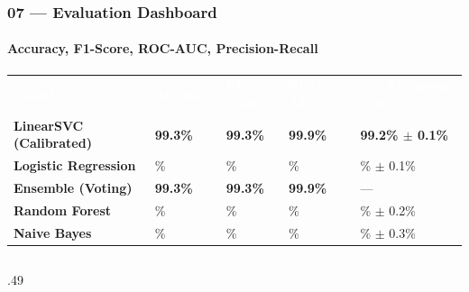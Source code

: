 \documentclass[aspectratio=169,10pt]{beamer}
\begin{document}
\begin{frame}[t]
\frametitle{07 --- Evaluation Dashboard}
\framesubtitle{Accuracy, F1-Score, ROC-AUC, Precision-Recall}
\vspace{.04cm}
\renewcommand{\arraystretch}{1.12}
{\footnotesize
\begin{tabularx}{\textwidth}{%
  >{\bfseries\color{Navy}}p{3.4cm}
  >{\centering\arraybackslash}X>{\centering\arraybackslash}X
  >{\centering\arraybackslash}X>{\centering\arraybackslash}X}
\rowcolor{Navy}
\textcolor{white}{\textbf{Model}}&\textcolor{white}{\textbf{Accuracy}}&
\textcolor{white}{\textbf{F1-Score}}&\textcolor{white}{\textbf{ROC-AUC}}&
\textcolor{white}{\textbf{CV F1 (mean$\pm$std)}}\\
\rowcolor{GreenL}
\textbf{LinearSVC (Calibrated)}&\textcolor{AGreen}{\textbf{99.3\%}}&
\textcolor{AGreen}{\textbf{99.3\%}}&\textcolor{AGreen}{\textbf{99.9\%}}&
\textcolor{AGreen}{\textbf{99.2\% $\pm$ 0.1\%}}\\
Logistic Regression&99.1\%&99.1\%&99.8\%&99.0\% $\pm$ 0.1\%\\
\rowcolor{GreenL}
\textbf{Ensemble (Voting)}&\textcolor{AGreen}{\textbf{99.3\%}}&
\textcolor{AGreen}{\textbf{99.3\%}}&\textcolor{AGreen}{\textbf{99.9\%}}&---\\
Random Forest&98.6\%&98.5\%&99.7\%&98.4\% $\pm$ 0.2\%\\
\rowcolor{SlateL}
Naive Bayes&95.8\%&95.7\%&99.2\%&95.6\% $\pm$ 0.3\%\\
\end{tabularx}}
\vspace{.1cm}
\begin{columns}[T]
\begin{column}{.49\textwidth}
  \begin{tcolorbox}[mycard={BlueMid}{ABlue},top=2pt,bottom=2pt]
    \\[2pt]
\end{tcolorbox}
\end{column}
\end{columns}
\end{frame}
\end{document}
